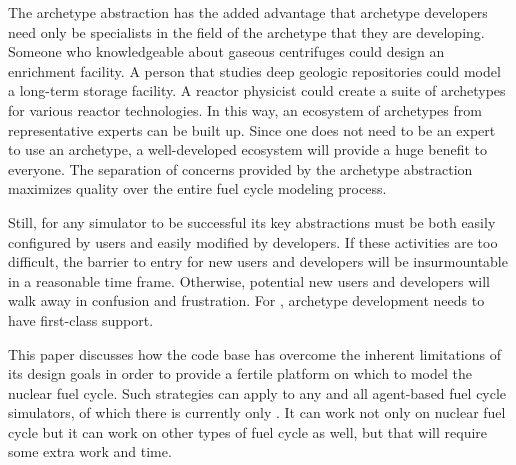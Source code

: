 The archetype abstraction has the added advantage that archetype developers 
need only be specialists in the field of the archetype that they are developing.
Someone who knowledgeable about gaseous centrifuges could design 
an enrichment facility. A person that studies deep geologic repositories
could model a long-term storage facility. A reactor physicist could create 
a suite of archetypes for various reactor technologies. In this way, an ecosystem 
of archetypes from representative experts can be built up. Since one does not need
to be an expert to use an archetype, a well-developed ecosystem will provide 
a huge benefit to everyone. The separation of concerns provided by the archetype 
abstraction maximizes quality over the entire fuel cycle modeling process.

Still, for any simulator to be successful its key abstractions must be both easily 
configured by users and easily modified by developers.  If these activities are 
too difficult, the barrier to entry for new users and developers will be 
insurmountable in a reasonable time frame. Otherwise, potential new users and developers will 
walk away in confusion and frustration. For \cyclus, archetype development
needs to have first-class support.

This paper discusses how the \cyclus code base has overcome the inherent limitations
of its design goals in order 
to provide a fertile platform on which to model the nuclear fuel cycle.
Such strategies can apply to any and all agent-based fuel cycle simulators, of which 
there is currently only \cyclus. It can work not only on nuclear fuel cycle but it can work on
other types of fuel cycle as well, but that will require some extra work and time.  
